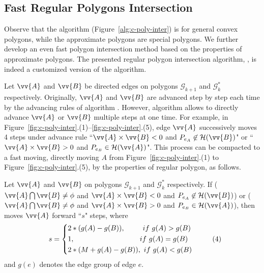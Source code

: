 



\subsection{Fast Regular Polygons Intersection}


Observe that the \cpia algorithm (Figure~\ref{alg:c-poly-inter}) is for general convex polygons, while the approximate polygons are special polygons. We further develop an even fast polygon intersection method based on the properties of approximate polygons.
%
The presented regular polygon intersection algorithm, \ie \rpia, is indeed a customized version of the \cpia algorithm.

Let $\vv{A}$ and $\vv{B}$ be directed edges on polygons $\mathcal{G}_{k+1}$ and $\mathcal{G}^*_k$ respectively.
Originally, $\vv{A}$ and $\vv{B}$ are advanced step by step each time by the advancing rules of algorithm \cpia .
However, algorithm \rpia allows to directly advance $\vv{A}$ or $\vv{B}$ multiple steps at one time.
%
For example, in Figure~\ref{fig:c-poly-inter}.(1)--\ref{fig:c-poly-inter}.(5), edge $\vv{A}$ successively moves 4 steps under advance rule ``$\vv{A} \times \vv{B} < 0$ and $P_{e_A} \not \in \mathcal{H}(\vv{B})$" or ``$\vv{A} \times \vv{B} > 0$ and $P_{e_B} \in \mathcal{H}(\vv{A})$".
This process can be compacted to a fast moving, \ie directly moving $A$ from Figure~\ref{fig:c-poly-inter}.(1) to Figure~\ref{fig:c-poly-inter}.(5), by the properties of regular polygon, as follows.



\vspace{1ex}
\begin{theorem}
\label{prop-rule1}
Let $\vv{A}$ and $\vv{B}$ on polygons $\mathcal{G}_{k+1}$ and $\mathcal{G}^*_k$ respectively.
If ($\vv{A} \bigcap \vv{B} \ne \phi$ and $\vv{A} \times \vv{B} < 0$ and $P_{e_A} \not \in \mathcal{H}(\vv{B})$) or ($\vv{A} \bigcap \vv{B} \ne \phi$ and $\vv{A} \times \vv{B} > 0$ and $P_{e_B} \in \mathcal{H}(\vv{A})$), then moves $\vv{A}$ forward ``$s$" steps, where 
\begin{equation*}
\label{equ-rule1}
\small
    \hspace{2ex} s =  \left\{
    \begin{aligned}
        & 2*(g(A) - g(B)),  \hspace{5ex} ~if  ~g(A) > g(B) \\
        & {1},              \hspace{20.5ex}~if  ~g(A) = g(B) \\
        & 2*(M+g(A) - g(B)), ~if  ~g(A) < g(B) \\
    \end{aligned}
    \right.       \hspace{6ex}(4)
\end{equation*}
and $g(e)$ denotes the edge group of edge $e$.
\end{theorem}




